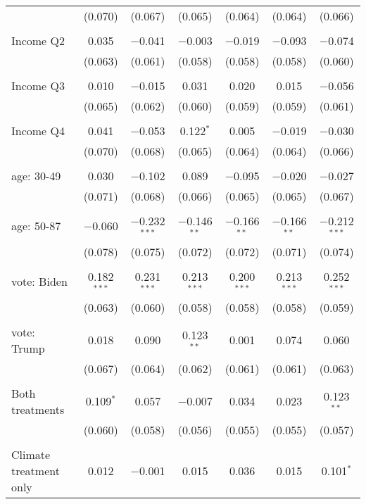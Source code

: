 \begin{tabular}{@{\extracolsep{5pt}}lcccccc}
  & (0.070) & (0.067) & (0.065) & (0.064) & (0.064) & (0.066) \\ 
  & & & & & & \\ 
 Income Q2 & 0.035 & $-$0.041 & $-$0.003 & $-$0.019 & $-$0.093 & $-$0.074 \\ 
  & (0.063) & (0.061) & (0.058) & (0.058) & (0.058) & (0.060) \\ 
  & & & & & & \\ 
 Income Q3 & 0.010 & $-$0.015 & 0.031 & 0.020 & 0.015 & $-$0.056 \\ 
  & (0.065) & (0.062) & (0.060) & (0.059) & (0.059) & (0.061) \\ 
  & & & & & & \\ 
 Income Q4 & 0.041 & $-$0.053 & 0.122$^{*}$ & 0.005 & $-$0.019 & $-$0.030 \\ 
  & (0.070) & (0.068) & (0.065) & (0.064) & (0.064) & (0.066) \\ 
  & & & & & & \\ 
 age: 30-49 & 0.030 & $-$0.102 & 0.089 & $-$0.095 & $-$0.020 & $-$0.027 \\ 
  & (0.071) & (0.068) & (0.066) & (0.065) & (0.065) & (0.067) \\ 
  & & & & & & \\ 
 age: 50-87 & $-$0.060 & $-$0.232$^{***}$ & $-$0.146$^{**}$ & $-$0.166$^{**}$ & $-$0.166$^{**}$ & $-$0.212$^{***}$ \\ 
  & (0.078) & (0.075) & (0.072) & (0.072) & (0.071) & (0.074) \\ 
  & & & & & & \\ 
 vote: Biden & 0.182$^{***}$ & 0.231$^{***}$ & 0.213$^{***}$ & 0.200$^{***}$ & 0.213$^{***}$ & 0.252$^{***}$ \\ 
  & (0.063) & (0.060) & (0.058) & (0.058) & (0.058) & (0.059) \\ 
  & & & & & & \\ 
 vote: Trump & 0.018 & 0.090 & 0.123$^{**}$ & 0.001 & 0.074 & 0.060 \\ 
  & (0.067) & (0.064) & (0.062) & (0.061) & (0.061) & (0.063) \\ 
  & & & & & & \\ 
 Both treatments & 0.109$^{*}$ & 0.057 & $-$0.007 & 0.034 & 0.023 & 0.123$^{**}$ \\ 
  & (0.060) & (0.058) & (0.056) & (0.055) & (0.055) & (0.057) \\ 
  & & & & & & \\ 
 Climate treatment only & 0.012 & $-$0.001 & 0.015 & 0.036 & 0.015 & 0.101$^{*}$ \\ 

\end{tabular}
